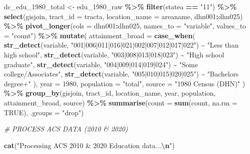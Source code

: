 \documentclass[
]{article}
\newenvironment{Shaded}{\begin{snugshade}}{\end{snugshade}}
\newcommand{\AttributeTok}[1]{\textcolor[rgb]{0.13,0.29,0.53}{#1}}
\newcommand{\CommentTok}[1]{\textcolor[rgb]{0.56,0.35,0.01}{\textit{#1}}}
\newcommand{\ConstantTok}[1]{\textcolor[rgb]{0.56,0.35,0.01}{#1}}
\newcommand{\DecValTok}[1]{\textcolor[rgb]{0.00,0.00,0.81}{#1}}
\newcommand{\FunctionTok}[1]{\textcolor[rgb]{0.13,0.29,0.53}{\textbf{#1}}}
\newcommand{\NormalTok}[1]{#1}
\newcommand{\OtherTok}[1]{\textcolor[rgb]{0.56,0.35,0.01}{#1}}
\newcommand{\SpecialCharTok}[1]{\textcolor[rgb]{0.81,0.36,0.00}{\textbf{#1}}}
\newcommand{\StringTok}[1]{\textcolor[rgb]{0.31,0.60,0.02}{#1}}
\begin{document}
\begin{Shaded}
\begin{Highlighting}[]
\NormalTok{dc\_edu\_1980\_total }\OtherTok{\textless{}{-}}\NormalTok{ edu\_1980\_raw }\SpecialCharTok{\%\textgreater{}\%}
  \FunctionTok{filter}\NormalTok{(statea }\SpecialCharTok{==} \StringTok{"11"}\NormalTok{) }\SpecialCharTok{\%\textgreater{}\%}
  \FunctionTok{select}\NormalTok{(gisjoin, }\AttributeTok{tract\_id =}\NormalTok{ tracta, }\AttributeTok{location\_name =}\NormalTok{ areaname, dhn001}\SpecialCharTok{:}\NormalTok{dhn025) }\SpecialCharTok{\%\textgreater{}\%}
  \FunctionTok{pivot\_longer}\NormalTok{(}\AttributeTok{cols =}\NormalTok{ dhn001}\SpecialCharTok{:}\NormalTok{dhn025, }\AttributeTok{names\_to =} \StringTok{"variable"}\NormalTok{, }\AttributeTok{values\_to =} \StringTok{"count"}\NormalTok{) }\SpecialCharTok{\%\textgreater{}\%}
  \FunctionTok{mutate}\NormalTok{(}
    \AttributeTok{attainment\_broad =} \FunctionTok{case\_when}\NormalTok{(}
      \FunctionTok{str\_detect}\NormalTok{(variable, }\StringTok{"001|006|011|016|021|002|007|012|017|022"}\NormalTok{) }\SpecialCharTok{\textasciitilde{}} \StringTok{"Less than high school"}\NormalTok{,}
      \FunctionTok{str\_detect}\NormalTok{(variable, }\StringTok{"003|008|013|018|023"}\NormalTok{) }\SpecialCharTok{\textasciitilde{}} \StringTok{"High school graduate"}\NormalTok{,}
      \FunctionTok{str\_detect}\NormalTok{(variable, }\StringTok{"004|009|014|019|024"}\NormalTok{) }\SpecialCharTok{\textasciitilde{}} \StringTok{"Some college/Associate\textquotesingle{}s"}\NormalTok{,}
      \FunctionTok{str\_detect}\NormalTok{(variable, }\StringTok{"005|010|015|020|025"}\NormalTok{) }\SpecialCharTok{\textasciitilde{}} \StringTok{"Bachelor\textquotesingle{}s degree+"}
\NormalTok{    ),}
    \AttributeTok{year =} \DecValTok{1980}\NormalTok{, }\AttributeTok{population =} \StringTok{"total"}\NormalTok{, }\AttributeTok{source =} \StringTok{"1980 Census (DHN)"}
\NormalTok{  ) }\SpecialCharTok{\%\textgreater{}\%}
  \FunctionTok{group\_by}\NormalTok{(gisjoin, tract\_id, location\_name, year, population, attainment\_broad, source) }\SpecialCharTok{\%\textgreater{}\%}
  \FunctionTok{summarise}\NormalTok{(}\AttributeTok{count =} \FunctionTok{sum}\NormalTok{(count, }\AttributeTok{na.rm =} \ConstantTok{TRUE}\NormalTok{), }\AttributeTok{.groups =} \StringTok{"drop"}\NormalTok{)}

\CommentTok{\#  PROCESS ACS DATA (2010 \& 2020)}

\FunctionTok{cat}\NormalTok{(}\StringTok{"Processing ACS 2010 \& 2020 Education data...}\SpecialCharTok{\textbackslash{}n}\StringTok{"}\NormalTok{)}
\end{Highlighting}
\end{Shaded}
\end{document}

